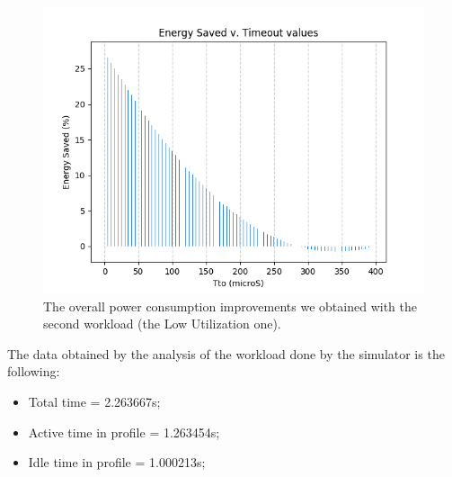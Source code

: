 \documentclass[a4paper]{article}
\begin{document}
            \begin{figure}[htp]
                \centering
                \includegraphics[width=0.6 \columnwidth]{./screenshots/Idle_case2.png}
                \caption{
                        \label{fig:Idle_case2}
                        The overall power consumption improvements we obtained with the second workload (the Low Utilization one).
                }
            \end{figure}

            The data obtained by the analysis of the workload done by the simulator is the following:
            \begin{itemize}
                \item Total time = 2.263667s;
                \item Active time in profile = 1.263454s;
                \item Idle time in profile = 1.000213s;
            \end{itemize}
\end{document}
